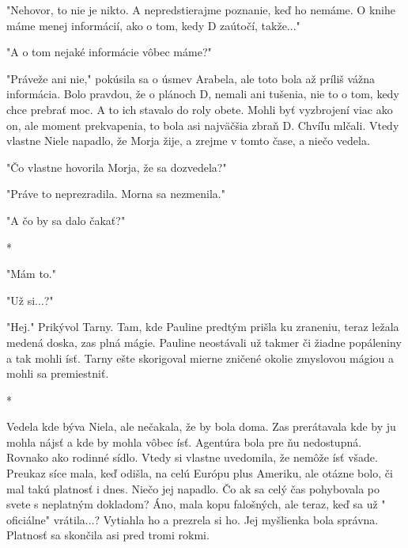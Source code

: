 \documentclass{book}
\begin{document}
"$ $Nehovor, to nie je nikto. A nepredstierajme poznanie, keď ho nemáme. O knihe máme menej informácií, ako o tom, kedy D zaútočí, takže..."$ $ 

"$ $A o tom nejaké informácie vôbec máme?"$ $ 

"$ $Práveže ani nie,"$ $  pokúsila sa o úsmev Arabela, ale toto bola až príliš vážna informácia. Bolo pravdou, že o plánoch D, nemali ani tušenia, nie to o tom, kedy chce prebrať moc. A to ich stavalo do roly obete. Mohli byť vyzbrojení viac ako on, ale moment prekvapenia, to bola asi najväčšia zbraň D. Chvíľu mlčali. Vtedy vlastne Niele napadlo, že Morja žije, a zrejme v tomto čase, a niečo vedela.

"$ $Čo vlastne hovorila Morja, že sa dozvedela?"$ $ 

"$ $Práve to neprezradila. Morna sa nezmenila."$ $ 

"$ $A čo by sa dalo čakať?"$ $ 

\begin{center}

*

\end{center}

"$ $Mám to."$ $ 

"$ $Už si...?"$ $ 

"$ $Hej."$ $  Prikývol Tarny. Tam, kde Pauline predtým prišla ku zraneniu, teraz ležala medená doska, zas plná mágie. Pauline neostávali už takmer či žiadne popáleniny a tak mohli ísť. Tarny ešte skorigoval mierne zničené okolie zmyslovou mágiou a mohli sa premiestniť.

\begin{center}

*

\end{center}

Vedela kde býva Niela, ale nečakala, že by bola doma. Zas prerátavala kde by ju mohla nájsť a kde by mohla vôbec ísť. Agentúra bola pre ňu nedostupná. Rovnako ako rodinné sídlo. Vtedy si vlastne uvedomila, že nemôže ísť všade. Preukaz síce mala, keď odišla, na celú Európu plus Ameriku, ale otázne bolo, či mal takú platnosť i dnes. Niečo jej napadlo. Čo ak sa celý čas pohybovala po svete s neplatným dokladom? Áno, mala kopu falošných, ale teraz, keď sa už "$ $oficiálne"$ $  vrátila...? Vytiahla ho a prezrela si ho. Jej myšlienka bola správna. Platnosť sa skončila asi pred tromi rokmi.
\end{document}
